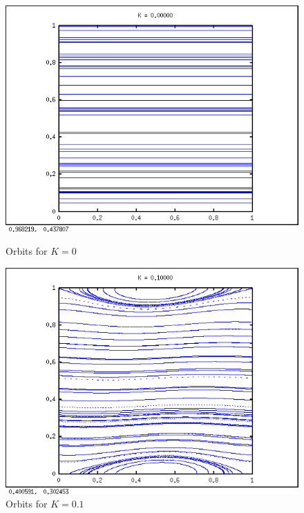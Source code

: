 \documentclass{article}
\begin{document}
\begin{figure}[H]
\centering
\begin{minipage}{0.5\textwidth}
\centering
\includegraphics[width=\textwidth]{k0.png}
\caption{Orbits for $K = 0$}
\end{minipage}\hfill
\begin{minipage}{0.5\textwidth}
\centering
\includegraphics[width=\textwidth]{k01.png}
\caption{Orbits for $K = 0.1$}
\end{minipage}
\end{figure}
\end{document}
